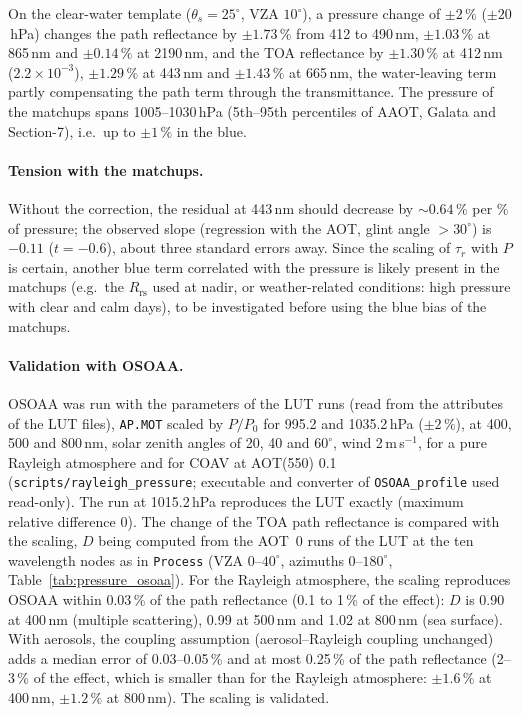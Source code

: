 \documentclass[11pt,a4paper]{article}
\newcommand{\Rrs}{R_\mathrm{rs}}
\newcommand{\code}[1]{\texttt{#1}}
\begin{document}
On the clear-water template ($\theta_s = 25^\circ$, VZA $10^\circ$), a pressure change of $\pm2\,\%$ ($\pm20$\,hPa) changes
the path reflectance by $\pm1.73\,\%$ from 412 to 490\,nm, $\pm1.03\,\%$ at 865\,nm and $\pm0.14\,\%$ at 2190\,nm, and the
TOA reflectance by $\pm1.30\,\%$ at 412\,nm ($2.2\times10^{-3}$), $\pm1.29\,\%$ at 443\,nm and $\pm1.43\,\%$ at 665\,nm, the
water-leaving term partly compensating the path term through the transmittance. The pressure of the matchups spans
1005--1030\,hPa (5th--95th percentiles of AAOT, Galata and Section-7), i.e.\ up to $\pm1\,\%$ in the blue.

\paragraph{Tension with the matchups.} Without the correction, the residual at 443\,nm should decrease by
$\sim0.64\,\%$ per \% of pressure; the observed slope (regression with the AOT, glint angle $>30^\circ$) is $-0.11$
($t=-0.6$), about three standard errors away. Since the scaling of $\tau_r$ with $P$ is certain, another blue term
correlated with the pressure is likely present in the matchups (e.g.\ the $\Rrs$ used at nadir, or weather-related
conditions: high pressure with clear and calm days), to be investigated before using the blue bias of the matchups.

\paragraph{Validation with OSOAA.} OSOAA was run with the parameters of the LUT runs (read from the attributes of
the LUT files), \code{AP.MOT} scaled by $P/P_0$ for 995.2 and 1035.2\,hPa ($\pm2\,\%$), at 400, 500 and 800\,nm, solar
zenith angles of 20, 40 and $60^\circ$, wind 2\,m\,s$^{-1}$, for a pure Rayleigh atmosphere and for COAV at AOT(550) 0.1
(\code{scripts/rayleigh\_pressure}; executable and converter of \code{OSOAA\_profile} used read-only). The run at
1015.2\,hPa reproduces the LUT exactly (maximum relative difference 0). The change of the TOA path reflectance is
compared with the scaling, $D$ being computed from the AOT~0 runs of the LUT at the ten wavelength nodes as in
\code{Process} (VZA 0--$40^\circ$, azimuths 0--$180^\circ$, Table~\ref{tab:pressure_osoaa}). For the Rayleigh atmosphere,
the scaling reproduces OSOAA within 0.03\,\% of the path reflectance (0.1 to 1\,\% of the effect): $D$ is 0.90 at
400\,nm (multiple scattering), 0.99 at 500\,nm and 1.02 at 800\,nm (sea surface). With aerosols, the coupling
assumption (aerosol--Rayleigh coupling unchanged) adds a median error of 0.03--0.05\,\% and at most 0.25\,\% of the
path reflectance (2--3\,\% of the effect, which is smaller than for the Rayleigh atmosphere: $\pm1.6\,\%$ at 400\,nm,
$\pm1.2\,\%$ at 800\,nm). The scaling is validated.
\end{document}
